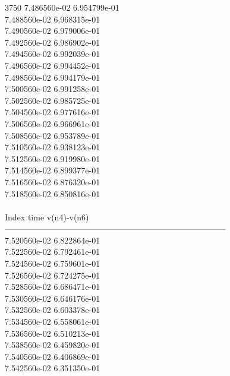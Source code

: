 3750	7.486560e-02	6.954799e-01	\\ 	7.488560e-02	6.968315e-01	\\ 	7.490560e-02	6.979006e-01	\\ 	7.492560e-02	6.986902e-01	\\ 	7.494560e-02	6.992039e-01	\\ 	7.496560e-02	6.994452e-01	\\ 	7.498560e-02	6.994179e-01	\\ 	7.500560e-02	6.991258e-01	\\ 	7.502560e-02	6.985725e-01	\\ 	7.504560e-02	6.977616e-01	\\ 	7.506560e-02	6.966961e-01	\\ 	7.508560e-02	6.953789e-01	\\ 	7.510560e-02	6.938123e-01	\\ 	7.512560e-02	6.919980e-01	\\ 	7.514560e-02	6.899377e-01	\\ 	7.516560e-02	6.876320e-01	\\ 	7.518560e-02	6.850816e-01	\\ \hline
\\ \hline
Index   time            v(n4)-v(n6)     \\ \hline
--------------------------------------------------------------------------------\\ 	7.520560e-02	6.822864e-01	\\ 	7.522560e-02	6.792461e-01	\\ 	7.524560e-02	6.759601e-01	\\ 	7.526560e-02	6.724275e-01	\\ 	7.528560e-02	6.686471e-01	\\ 	7.530560e-02	6.646176e-01	\\ 	7.532560e-02	6.603378e-01	\\ 	7.534560e-02	6.558061e-01	\\ 	7.536560e-02	6.510213e-01	\\ 	7.538560e-02	6.459820e-01	\\ 	7.540560e-02	6.406869e-01	\\ 	7.542560e-02	6.351350e-01	\\ \hline
